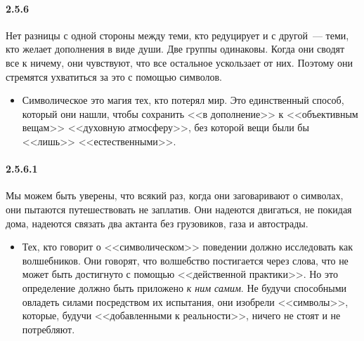 \paragraph{2.5.6}\hypertarget{par:2.5.6}{} Нет разницы с одной стороны между теми, кто редуцирует и с другой~--- теми, кто желает дополнения в виде души. Две группы одинаковы. Когда они сводят все к ничему, они чувствуют, что все остальное ускользает от них. Поэтому они стремятся ухватиться за это с помощью символов. 
	\begin{itemize}
	\item 
	Символическое это магия тех, кто потерял мир. Это единственный способ, который они нашли, чтобы сохранить <<в дополнение>> к <<объективным вещам>> <<духовную атмосферу>>, без которой вещи были бы <<лишь>> <<естественными>>.
	\end{itemize}

\paragraph{2.5.6.1}\hypertarget{par:2.5.6.1}{} Мы можем быть уверены, что всякий раз, когда они заговаривают о символах, они пытаются путешествовать не заплатив. Они надеются двигаться, не покидая дома, надеются связать два актанта без грузовиков, газа и автострады. 
	\begin{itemize}
	\item 
	Тех, кто говорит о <<символическом>> поведении должно исследовать как волшебников. Они говорят, что волшебство постигается через слова, что не может быть достигнуто с помощью <<действенной практики>>. Но это определение должно быть приложено {\itshape к ним самим}. Не будучи способными овладеть силами посредством их испытания, они изобрели <<символы>>, которые, будучи <<добавленными к реальности>>, ничего не стоят и не потребляют.
	\end{itemize}

